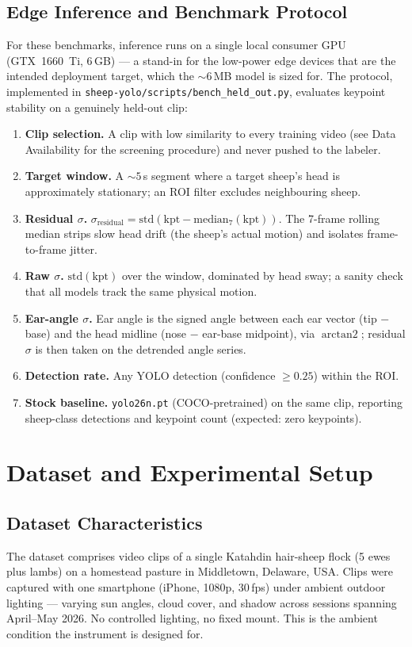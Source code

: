 \documentclass[11pt]{article}
\begin{document}
\subsection{Edge Inference and Benchmark Protocol}
\label{sec:bench}
For these benchmarks, inference runs on a single local consumer GPU (GTX~1660~Ti,
6\,GB) --- a stand-in for the low-power edge devices that are the intended
deployment target, which the ${\sim}6$\,MB model is sized for. The protocol, implemented in
\texttt{sheep-yolo/scripts/bench\_held\_out.py}, evaluates keypoint stability on
a genuinely held-out clip:
\begin{enumerate}
  \item \textbf{Clip selection.} A clip with low similarity to every training
  video (see Data Availability for the screening procedure) and never pushed to
  the labeler.
  \item \textbf{Target window.} A ${\sim}5$\,s segment where a target sheep's
  head is approximately stationary; an ROI filter excludes neighbouring sheep.
  \item \textbf{Residual $\sigma$.}
  $\sigma_{\text{residual}} = \mathrm{std}\!\left(\text{kpt} -
  \mathrm{median}_7(\text{kpt})\right)$. The 7-frame rolling median strips slow
  head drift (the sheep's actual motion) and isolates frame-to-frame jitter.
  \item \textbf{Raw $\sigma$.} $\mathrm{std}(\text{kpt})$ over the window,
  dominated by head sway; a sanity check that all models track the same physical
  motion.
  \item \textbf{Ear-angle $\sigma$.} Ear angle is the signed angle between each
  ear vector (tip $-$ base) and the head midline (nose $-$ ear-base midpoint),
  via $\operatorname{arctan2}$; residual $\sigma$ is then taken on the detrended
  angle series.
  \item \textbf{Detection rate.} Any YOLO detection (confidence $\geq 0.25$)
  within the ROI.
  \item \textbf{Stock baseline.} \texttt{yolo26n.pt} (COCO-pretrained) on the
  same clip, reporting sheep-class detections and keypoint count (expected:
  zero keypoints).
\end{enumerate}

\section{Dataset and Experimental Setup}

\subsection{Dataset Characteristics}
The dataset comprises video clips of a single Katahdin hair-sheep flock (5 ewes
plus lambs) on a homestead pasture in Middletown, Delaware, USA. Clips were
captured with one smartphone (iPhone, 1080p, 30\,fps) under ambient outdoor
lighting --- varying sun angles, cloud cover, and shadow across sessions
spanning April--May 2026. No controlled lighting, no fixed mount. This is the
ambient condition the instrument is designed for.
\end{document}

